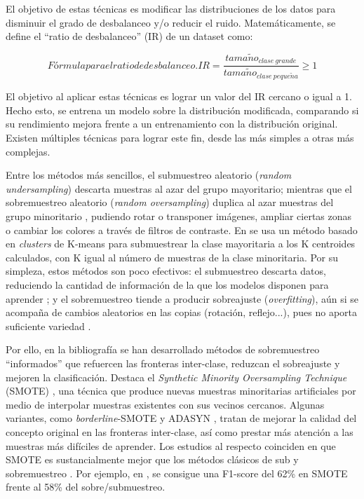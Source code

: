El objetivo de estas técnicas es modificar las distribuciones de los datos para disminuir el grado de desbalanceo y/o reducir el ruido. Matemáticamente, se define el ``ratio de desbalanceo'' (IR) de un dataset \cite{johnson2019survey,aka2021measuring,nafi2020addressing} como:

\begin{equation}[EQ:IMBRAT]{Fórmula para el ratio de desbalanceo.}
	IR=\frac{tama\tilde{n}o_{clase\ grande}}{tama\tilde{n}o_{clase\ peque\tilde{n}a}} \geq 1
\end{equation}

El objetivo al aplicar estas técnicas es lograr un valor del IR cercano o igual a 1. Hecho esto, se entrena un modelo sobre la distribución modificada, comparando si su rendimiento mejora frente a un entrenamiento con la distribución original. Existen múltiples técnicas para lograr este fin, desde las más simples a otras más complejas.

Entre los métodos más sencillos, el submuestreo aleatorio (\textit{random undersampling}) descarta muestras al azar del grupo mayoritario; mientras que el sobremuestreo aleatorio (\textit{random oversampling}) duplica al azar muestras del grupo minoritario \cite{johnson2019survey}, pudiendo rotar o transponer imágenes, ampliar ciertas zonas o cambiar los colores a través de filtros de contraste. En \citet{lin2017clustering} se usa un método basado en \textit{clusters} de K-means para submuestrear la clase mayoritaria a los K centroides calculados, con K igual al número de muestras de la clase minoritaria. Por su simpleza, estos métodos son poco efectivos: el submuestreo descarta datos, reduciendo la cantidad de información de la que los modelos disponen para aprender \cite{johnson2019survey}; y el sobremuestreo tiende a producir sobreajuste (\textit{overfitting}), aún si se acompaña de cambios aleatorios en las copias (rotación, reflejo...), pues no aporta suficiente variedad \cite{arjovsky2017wasserstein,chawla2002smote}.

Por ello, en la bibliografía se han desarrollado métodos de sobremuestreo ``informados'' que refuercen las fronteras inter-clase, reduzcan el sobreajuste y mejoren la clasificación. Destaca el \textit{Synthetic Minority Oversampling Technique} (SMOTE) \cite{chawla2002smote}, una técnica que produce nuevas muestras minoritarias artificiales por medio de interpolar muestras existentes con sus vecinos cercanos. Algunas variantes, como \textit{borderline}-SMOTE y ADASYN \cite{nafi2020addressing}, tratan de mejorar la calidad del concepto original en las fronteras inter-clase, así como prestar más atención a las muestras más difíciles de aprender. Los estudios al respecto coinciden en que SMOTE es sustancialmente mejor que los métodos clásicos de sub y sobremuestreo \cite{chawla2002smote,nafi2020addressing,johnson2019survey}. Por ejemplo, en \citet{nafi2020addressing}, se consigue una F1-score del 62\% en SMOTE frente al 58\% del sobre/submuestreo.

